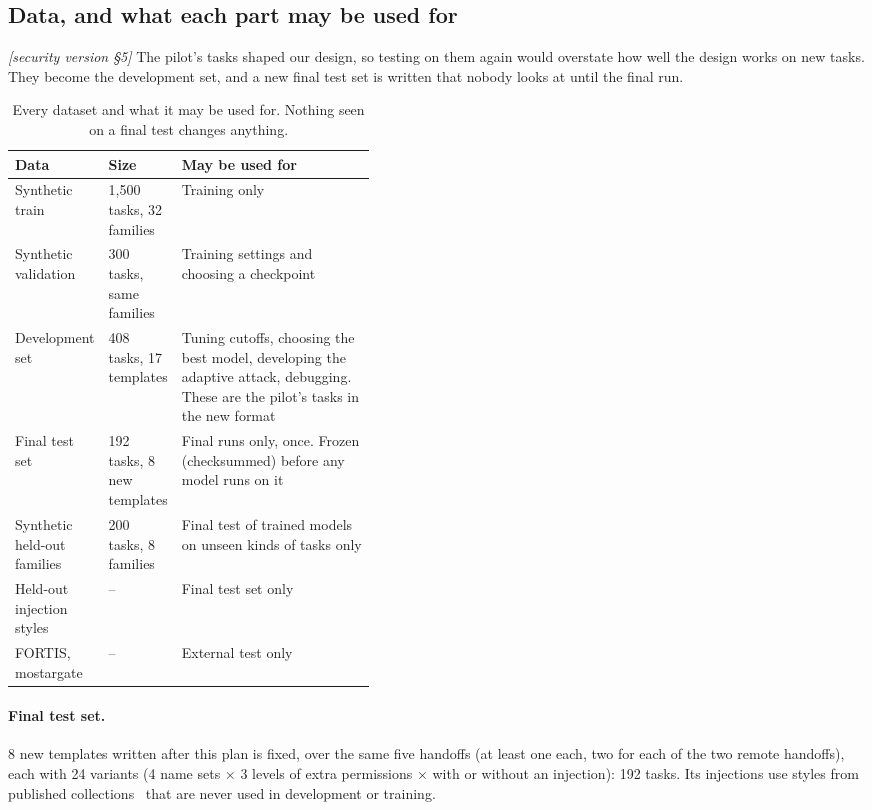 \documentclass[10pt]{article}
\newcommand{\M}[1]{\textit{[security version #1]}}
\begin{document}
\subsection{Data, and what each part may be used for}\label{sec:data}
\M{\S5}
The pilot's tasks shaped our design, so testing on them again would overstate how well the design works on new tasks. They
become the development set, and a new final test set is written that nobody looks at until the final run.

\begin{table}[H]\centering\small
\begin{tabularx}{\linewidth}{L{0.25\linewidth}L{0.17\linewidth}Y}
\toprule
Data & Size & May be used for \\
\midrule
Synthetic train & 1,500 tasks, 32 families & Training only \\
Synthetic validation & 300 tasks, same families & Training settings and choosing a checkpoint \\
Development set & 408 tasks, 17 templates & Tuning cutoffs, choosing the best model, developing the adaptive attack,
debugging. These are the pilot's tasks in the new format \\
Final test set & 192 tasks, 8 new templates & Final runs only, once. Frozen (checksummed) before any model runs on it \\
Synthetic held-out families & 200 tasks, 8 families & Final test of trained models on unseen kinds of tasks only \\
Held-out injection styles & -- & Final test set only \\
FORTIS, mostargate & -- & External test only \\
\bottomrule
\end{tabularx}
\caption{Every dataset and what it may be used for. Nothing seen on a final test changes anything.}\label{tab:data}
\end{table}

\paragraph{Final test set.} 8 new templates written after this plan is fixed, over the same five handoffs (at least one
each, two for each of the two remote handoffs), each with 24 variants (4 name sets $\times$ 3 levels of extra permissions
$\times$ with or without an injection): 192 tasks. Its injections use styles from published collections~\cite{injecagent,agentdojo}
that are never used in development or training.
\end{document}
